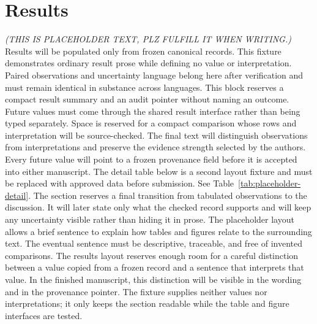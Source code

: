 \section{Results}\label{sec:results}
\textit{(THIS IS PLACEHOLDER TEXT, PLZ FULFILL IT WHEN WRITING.)}
Results will be populated only from frozen canonical records. This fixture demonstrates ordinary result prose while defining no value or interpretation.
Paired observations and uncertainty language belong here after verification and must remain identical in substance across languages.
This block reserves a compact result summary and an audit pointer without naming an outcome.
Future values must come through the shared result interface rather than being typed separately.
Space is reserved for a compact comparison whose rows and interpretation will be source-checked.
The final text will distinguish observations from interpretations and preserve the evidence strength selected by the authors.
Every future value will point to a frozen provenance field before it is accepted into either manuscript.
The detail table below is a second layout fixture and must be replaced with approved data before submission. See Table~\ref{tab:placeholder-detail}.
The section reserves a final transition from tabulated observations to the discussion. It will later state only what the checked record supports and will keep any uncertainty visible rather than hiding it in prose.
The placeholder layout allows a brief sentence to explain how tables and figures relate to the surrounding text. The eventual sentence must be descriptive, traceable, and free of invented comparisons.
The results layout reserves enough room for a careful distinction between a value copied from a frozen record and a sentence that interprets that value. In the finished manuscript, this distinction will be visible in the wording and in the provenance pointer. The fixture supplies neither values nor interpretations; it only keeps the section readable while the table and figure interfaces are tested.


